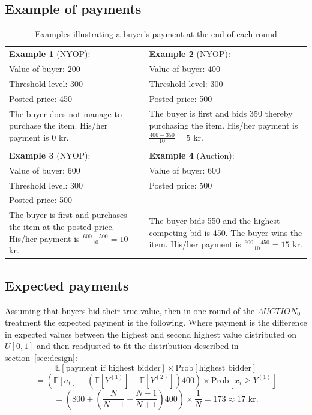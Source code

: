 \documentclass[a4paper,12pt]{article}
\begin{document}
	\subsection{Example of payments}
	\label{app:example_payment}

	\begin{table}[ht]
		\caption{Examples illustrating a buyer's payment at the end of each round}
		\begin{tabular}{p{}  p{}}
			{\bf Example 1} (NYOP): 	& {\bf Example 2} (NYOP):  		\\
			Value of buyer: 200 		& Value of buyer: 400 			\\
			Threshold level: 300 		& Threshold level: 300 			\\
			Posted price: 450 			& Posted price: 500 			\\
			The buyer does not manage to purchase the item. His/her payment is 0 kr. & The buyer is first and bids 350 thereby purchasing the item. His/her payment is $\frac{400-350}{10}=5$ kr. \\
			\multicolumn{2}{c}{} \\
			{\bf Example 3} (NYOP):  	& {\bf Example 4} (Auction): 	\\
			Value of buyer: 600 		& Value of buyer: 600  			\\
			Threshold level: 300  		& Posted price: 500  			\\
			Posted price: 500  			&  								\\
			The buyer is first and purchases the item at the posted price. His/her payment is $\frac{600-500}{10}=10$ kr. & The buyer bids 550 and the highest competing bid is 450. The buyer wins the item. His/her payment is $\frac{600-450}{10}=15$ kr. \\
		\end{tabular}
		\label{tab:payment}
	\end{table}

	\subsection{Expected payments}
	\label{app:expected_payment}
	
	Assuming that buyers bid their true value, then in one round of the $AUCTION_0$ treatment the expected payment is the following. Where payment is the difference in expected values between the highest and second highest value distributed on $U[0,1]$ and then readjusted to fit the distribution described in section~\ref{sec:design}:
	\[ \mathbb{E}[\mbox{payment if highest bidder}] \times \mbox{Prob}[\mbox{highest bidder}] \] 
	\[  = \left( \mathbb{E}[a_t] + (\mathbb{E}[Y^{(1)}]-\mathbb{E}[Y^{(2)}]) 400 \right) \times \mbox{Prob}[x_i \ge Y^{(1)}] \] 
	\[	= \left( 800 + \left(\frac{N}{N+1} - \frac{N-1}{N+1}\right)400 \right) \times \frac{1}{N} = 173 \approx 17\mbox{ kr.} \]
	
\end{document}
